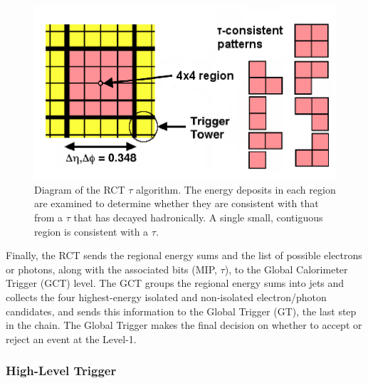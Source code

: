  \begin{figure}[htb]
  \begin{center}
    \includegraphics[width=400pt]{Figures/RCT-tau-algo.png} 
  \end{center}
  \caption[\fixspacing Diagram of the RCT $\tau$ algorithm]{
    \fixspacing Diagram of the RCT $\tau$ algorithm. 
    The energy deposits in each region are 
    examined to determine whether they are 
    consistent with that from a $\tau$ 
    that has decayed hadronically.  
    A single small, contiguous region 
    is consistent with a $\tau$. 
  }
  \label{fig:RctTauAlgo}
 \end{figure}

Finally, the RCT sends the regional energy sums 
and the list of possible 
electrons or photons, 
along with the associated bits (MIP, $\tau$), %
to the 
Global Calorimeter Trigger (GCT) level.  
The GCT groups the regional energy sums into jets 
and collects the four highest-energy isolated and 
non-isolated electron/photon candidates, 
and sends this information to the Global Trigger (GT), 
the last step in the chain.  
The Global Trigger makes the final decision on 
whether to accept or reject an event at the Level-1.  


\subsubsection{High-Level Trigger}
\label{exp:HLT}

